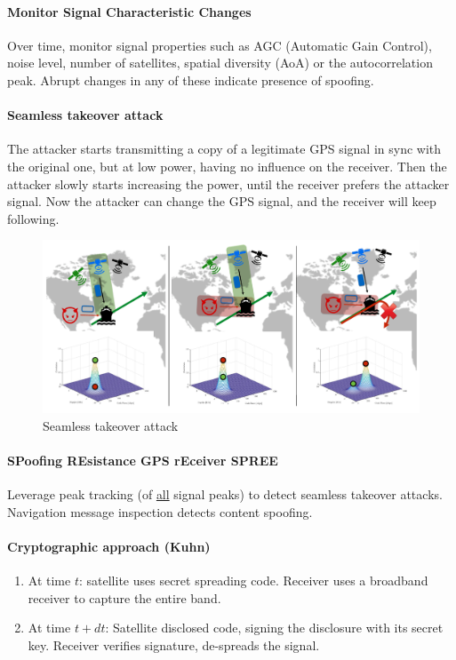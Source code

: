 \paragraph{Monitor Signal Characteristic Changes}
Over time, monitor signal properties such as AGC (Automatic Gain Control), noise level, number of satellites, spatial diversity (AoA) or the autocorrelation peak.
Abrupt changes in any of these indicate presence of spoofing.

\paragraph{Seamless takeover attack}
The attacker starts transmitting a copy of a legitimate GPS signal in sync with the original one, but at low power, having no influence on the receiver.
Then the attacker slowly starts increasing the power, until the receiver prefers the attacker signal.
Now the attacker can change the GPS signal, and the receiver will keep following. 

\begin{figure}
	\centering
	\includegraphics[scale=0.4]{images/4-seamless-takeover.png}
	\caption{Seamless takeover attack}
	\label{fig:seamless-takeover}
\end{figure}

\paragraph{SPoofing REsistance GPS rEceiver SPREE}
Leverage peak tracking (of \underline{all} signal peaks) to detect seamless takeover attacks.
Navigation message inspection detects content spoofing.

\paragraph{Cryptographic approach (Kuhn)}
\begin{enumerate}
	\item At time $t$: satellite uses secret spreading code.
	Receiver uses a broadband receiver to capture the entire band.
	\item At time $t+dt$: Satellite disclosed code, signing the disclosure with its secret key.
	Receiver verifies signature, de-spreads the signal.
\end{enumerate}

